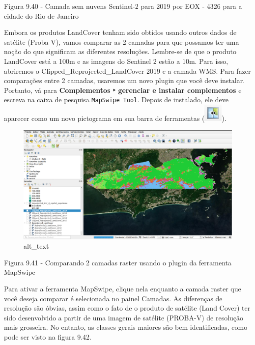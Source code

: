 \documentclass[
]{book}
\begin{document}
Figura 9.40 - Camada sem nuvens Sentinel-2 para 2019 por EOX - 4326 para a cidade do Rio de Janeiro

Embora os produtos LandCover tenham sido obtidos usando outros dados de satélite (Proba-V), vamos comparar as 2 camadas para que possamos ter uma noção do que significam as diferentes resoluções. Lembre-se de que o produto LandCover está a 100m e as imagens do Sentinel 2 estão a 10m. Para isso, abriremos o Clipped\_Reprojected\_LandCover 2019 e a camada WMS. Para fazer comparações entre 2 camadas, usaremos um novo plugin que você deve instalar. Portanto, vá para \textbf{Complementos ‣ gerenciar e instalar complementos} e escreva na caixa de pesquisa \texttt{MapSwipe\ Tool}. Depois de instalado, ele deve aparecer como um novo pictograma em sua barra de ferramentas (\includegraphics{media/modulo9/mapswipe-btn.png}).

\begin{figure}
\centering
\includegraphics{media/modulo9/fig941.png}
\caption{alt\_text}
\end{figure}

Figura 9.41 - Comparando 2 camadas raster usando o plugin da ferramenta MapSwipe

Para ativar a ferramenta MapSwipe, clique nela enquanto a camada raster que você deseja comparar é selecionada no painel Camadas. As diferenças de resolução são óbvias, assim como o fato de o produto de satélite (Land Cover) ter sido desenvolvido a partir de uma imagem de satélite (PROBA-V) de resolução mais grosseira. No entanto, as classes gerais maiores são bem identificadas, como pode ser visto na figura 9.42.
\end{document}
